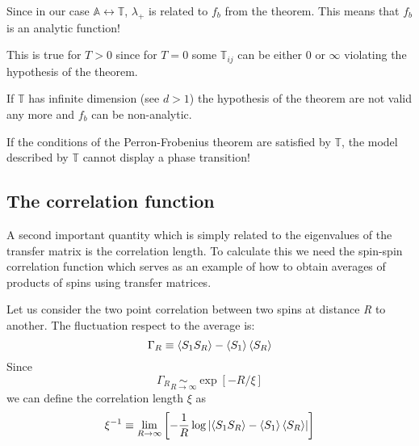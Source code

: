 \documentclass[../main/main.tex]{subfiles}
\begin{document}
\begin{remark}
Since in our case \( \mathbb{A} \leftrightarrow  \mathbb{T} \), \( \lambda _+ \) is related to \( f_b \) from the theorem. This means that \( f_b \) is an analytic function!
\end{remark}
\begin{remark}
This is true for \( T>0 \) since for \( T=0 \) some \( \mathbb{T}_{ij} \) can be either 0 or \( \infty  \) violating the hypothesis of the theorem.
\end{remark}
\begin{remark}
If \( \mathbb{T} \) has infinite dimension (see \( d>1 \)) the hypothesis of the theorem are not valid any more and \( f_b \) can be non-analytic.
\end{remark}
If the conditions of the Perron-Frobenius theorem are satisfied by \( \mathbb{T} \), the model described by  \( \mathbb{T} \) cannot display a phase transition!

\subsection{The correlation function}
A second important quantity which is simply related to the eigenvalues of the transfer matrix is the correlation length. To calculate this we need the spin-spin correlation function which serves as an example of how to obtain averages of products of spins using transfer matrices.

Let us consider the two point correlation between two spins at distance \emph{R} to another. The fluctuation respect to the average is:
\begin{equation}
  \Gamma _R \equiv  \expval{S_1 S_R} - \expval{S_1}\expval{S_R}
\end{equation}
Since
\begin{equation}
  \Gamma _R \underset{R \rightarrow \infty }{\sim } \exp [-R/\xi ]
\end{equation}
we can define the correlation length \( \xi  \) as
\begin{equation}
  \xi^{-1} \equiv  \lim_{R \rightarrow \infty } \qty[ - \frac{1}{R} \log{ \qty| \expval{S_1 S_R} - \expval{S_1}\expval{S_R}| } ]
  \label{eq:7_2}
\end{equation}
\end{document}
